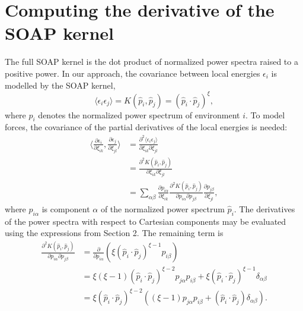 \documentclass[%
preprint,
amsmath,amssymb,
aps,
]{revtex4-1}
\begin{document}
\section{Computing the derivative of the SOAP kernel}

The full SOAP kernel is the dot product of normalized power spectra raised to a positive power. In our approach, the covariance between local energies $\epsilon_i$ is modelled by the SOAP kernel,
\begin{equation}
\langle \epsilon_i \epsilon_j \rangle = K(\hat{p}_i, \hat{p}_j) = \left( \hat{p}_i \cdot \hat{p}_j \right)^{\xi},
\end{equation}
where $\hat{p}_i$ denotes the normalized power spectrum of environment $i$. To model forces, the covariance of the partial derivatives of the local energies is needed:
\begin{equation}
    \begin{split}
\bigg\langle \frac{\partial \epsilon_i}{\partial \xi_{ik}}, \frac{\partial \epsilon_j}{\partial\xi_{jl}}\bigg\rangle &= \frac{\partial^2 \langle \epsilon_i \epsilon_j \rangle}{\partial \xi_{ik} \partial \xi_{jl}}\\
&= \frac{\partial^2 K(\hat{p}_i, \hat{p}_j)}{\partial \xi_{ik} \partial \xi_{jl}} \\
&= \sum_{\alpha \beta} \frac{\partial p_{i\alpha}}{\partial \xi_{ik}} \frac{\partial^2 K(\hat{p}_i, \hat{p}_j)}{\partial p_{i\alpha} \partial p_{j\beta}} \frac{\partial p_{j\beta}}{\partial \xi_{jl}},
    \end{split}
\end{equation}
where $p_{i\alpha}$ is component $\alpha$ of the normalized power spectrum $\hat{p}_i$. The derivatives of the power spectra with respect to Cartesian components may be evaluated using the expressions from Section 2. The remaining term is
\begin{equation}
\begin{split}
\frac{\partial^2 K(\hat{p}_i, \hat{p}_j)}{\partial p_{i\alpha} \partial p_{j\beta}} &= \frac{\partial}{\partial p_{i \alpha}} \left( \xi (\hat{p}_i \cdot \hat{p}_j)^{\xi - 1} p_{i \beta} \right) \\
&= \xi (\xi - 1) (\hat{p}_i \cdot \hat{p}_j)^{\xi - 2} p_{j\alpha} p_{i \beta} + \xi (\hat{p}_i \cdot \hat{p}_j)^{\xi - 1} \delta_{\alpha \beta} \\
&= \xi (\hat{p}_i \cdot \hat{p}_j)^{\xi - 2} \left( (\xi - 1) p_{j\alpha} p_{i\beta} + (\hat{p}_i \cdot \hat{p}_j) \delta_{\alpha \beta} \right).
\end{split}
\end{equation}
\end{document}
